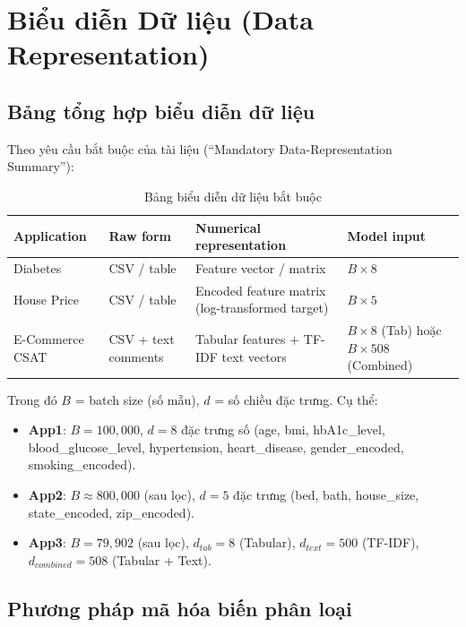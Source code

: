 \documentclass[12pt, a4paper]{article}
\begin{document}
\section{Biểu diễn Dữ liệu (Data Representation)}

\subsection{Bảng tổng hợp biểu diễn dữ liệu}

Theo yêu cầu bắt buộc của tài liệu (``Mandatory Data-Representation Summary''):

\begin{table}[H]
\centering
\caption{Bảng biểu diễn dữ liệu bắt buộc}
\label{tab:data_repr}
\small
\begin{tabularx}{\textwidth}{|l|X|X|X|}
\hline
\textbf{Application} & \textbf{Raw form} & \textbf{Numerical representation} & \textbf{Model input} \\
\hline
Diabetes & CSV / table & Feature vector / matrix & $B \times 8$ \\
\hline
House Price & CSV / table & Encoded feature matrix (log-transformed target) & $B \times 5$ \\
\hline
E-Commerce CSAT & CSV + text comments & Tabular features + TF-IDF text vectors & $B \times 8$ (Tab) hoặc $B \times 508$ (Combined) \\
\hline
\end{tabularx}
\end{table}

Trong đó $B$ = batch size (số mẫu), $d$ = số chiều đặc trưng. Cụ thể:
\begin{itemize}
    \item \textbf{App1}: $B = 100{,}000$, $d = 8$ đặc trưng số (age, bmi, hbA1c\_level, blood\_glucose\_level, hypertension, heart\_disease, gender\_encoded, smoking\_encoded).
    \item \textbf{App2}: $B \approx 800{,}000$ (sau lọc), $d = 5$ đặc trưng (bed, bath, house\_size, state\_encoded, zip\_encoded).
    \item \textbf{App3}: $B = 79{,}902$ (sau lọc), $d_{tab} = 8$ (Tabular), $d_{text} = 500$ (TF-IDF), $d_{combined} = 508$ (Tabular + Text).
\end{itemize}

\subsection{Phương pháp mã hóa biến phân loại}
\end{document}
